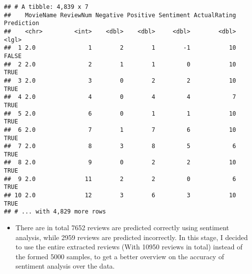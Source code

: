 \documentclass[]{article}
\newenvironment{Shaded}{\begin{snugshade}}{\end{snugshade}}
\newcommand{\KeywordTok}[1]{\textcolor[rgb]{0.13,0.29,0.53}{\textbf{#1}}}
\newcommand{\DecValTok}[1]{\textcolor[rgb]{0.00,0.00,0.81}{#1}}
\newcommand{\StringTok}[1]{\textcolor[rgb]{0.31,0.60,0.02}{#1}}
\newcommand{\OperatorTok}[1]{\textcolor[rgb]{0.81,0.36,0.00}{\textbf{#1}}}
\newcommand{\NormalTok}[1]{#1}
\providecommand{\tightlist}{%
  \setlength{\itemsep}{0pt}\setlength{\parskip}{0pt}}
\begin{document}
\begin{Shaded}
\begin{Highlighting}[]
{{\NormalTok{movieListBasedMeasure}\OperatorTok{$}\NormalTok{Prediction <-}\StringTok{ }\NormalTok{((movieListBasedMeasure}\OperatorTok{$}\NormalTok{Sentiment }\OperatorTok{<}\StringTok{ }\DecValTok{0} \OperatorTok{&}\StringTok{ }\NormalTok{movieListBasedMeasure}\OperatorTok{$}\NormalTok{ActualRating }\OperatorTok{<}\StringTok{ }\DecValTok{5}\NormalTok{) }\OperatorTok{|}\StringTok{ }\NormalTok{movieListBasedMeasure}\OperatorTok{$}\NormalTok{Sentiment }\OperatorTok{>=}\StringTok{ }\DecValTok{0} \OperatorTok{&}\StringTok{ }\NormalTok{movieListBasedMeasure}\OperatorTok{$}\NormalTok{ActualRating }\OperatorTok{>=}\StringTok{ }\DecValTok{5}\NormalTok{)}
\NormalTok{movieListBasedMeasure}
\end{Highlighting}
\end{Shaded}

\begin{verbatim}
## # A tibble: 4,839 x 7
##    MovieName ReviewNum Negative Positive Sentiment ActualRating Prediction
##    <chr>         <int>    <dbl>    <dbl>     <dbl>        <dbl> <lgl>     
##  1 2.0               1        2        1        -1           10 FALSE     
##  2 2.0               2        1        1         0           10 TRUE      
##  3 2.0               3        0        2         2           10 TRUE      
##  4 2.0               4        0        4         4            7 TRUE      
##  5 2.0               6        0        1         1           10 TRUE      
##  6 2.0               7        1        7         6           10 TRUE      
##  7 2.0               8        3        8         5            6 TRUE      
##  8 2.0               9        0        2         2           10 TRUE      
##  9 2.0              11        2        2         0            6 TRUE      
## 10 2.0              12        3        6         3           10 TRUE      
## # ... with 4,829 more rows
\end{verbatim}

\begin{itemize}
\tightlist
\item
  There are in total 7652 reviews are predicted correctly using
  sentiment analysis, while 2959 reviews are predicted incorrectly. In
  this stage, I decided to use the entire extracted reviews (With 10950
  reviews in total) instead of the formed 5000 samples, to get a better
  overview on the accuracy of sentiment analysis over the data.
\end{itemize}

\begin{Shaded}
\end{Shaded}
\end{document}
